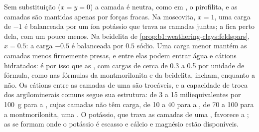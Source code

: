 Sem substituição ($x = y = 0$) a camada é neutra, como em , o  pirofilita, e as camadas são mantidas apenas por forças fracas. Na moscovita, $x = 1$, uma carga de $-1$ é balanceada por um íon potássio que trava as camadas juntas; a  fica perto dela, com um pouco menos. Na beidelita de \cref{prop:b1:weathering-clays:feldspars}, $x = 0.5$: a carga $-0.5$ é balanceada por $0.5$ sódio. Uma carga menor mantém as camadas menos firmemente presas, e entre elas podem entrar água e cátions hidratados: é por isso que as , com cargas de cerca de 0.3 a 0.5 por unidade de fórmula, como nas fórmulas da montmorilonita e da beidelita, incham, enquanto a  não. Os cátions entre as camadas de uma  são trocáveis, e a capacidade de troca dos argilominerais comuns segue sua estrutura: de 3 a 15 miliequivalentes por \qty{100}{g} para a , cujas camadas não têm carga, de 10 a 40 para a , de 70 a 100 para a montmorilonita, uma . O potássio, que trava as camadas de uma , favorece a ; as  se formam onde o potássio é escasso e cálcio e magnésio estão disponíveis.

